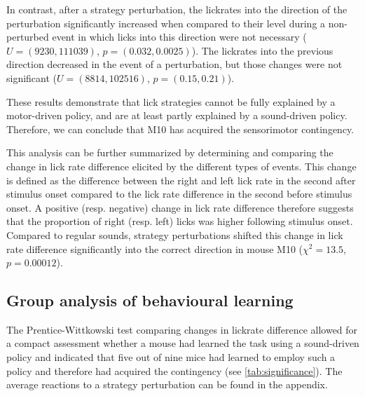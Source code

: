 \documentclass[]{report}
\theoremstyle{definition}
\theoremstyle{definition}
\theoremstyle{definition}
\theoremstyle{remark}
\begin{document}
In contrast, after a strategy perturbation, the lickrates into the
direction of the perturbation significantly increased when compared to
their level during a non-perturbed event in which licks into this
direction were not necessary (\(U=(9230,111039)\),
\(p=(0.032, 0.0025)\)). The lickrates into the previous direction
decreased in the event of a perturbation, but those changes were not
significant (\(U=(8814, 102516)\), \(p=(0.15, 0.21)\)).

These results demonstrate that lick strategies cannot be fully explained
by a motor-driven policy, and are at least partly explained by a
sound-driven policy. Therefore, we can conclude that M10 has acquired
the sensorimotor contingency.

This analysis can be further summarized by determining and comparing the
change in lick rate difference elicited by the different types of
events. This change is defined as the difference between the right and
left lick rate in the second after stimulus onset compared to the lick
rate difference in the second before stimulus onset. A positive (resp.
negative) change in lick rate difference therefore suggests that the
proportion of right (resp. left) licks was higher following stimulus
onset. Compared to regular sounds, strategy perturbations shifted this
change in lick rate difference significantly into the correct direction
in mouse M10 (\(\chi^2=13.5\), \(p=0.00012\)).

\hypertarget{group-analysis-of-behavioural-learning}{%
\subsection{Group analysis of behavioural
learning}\label{group-analysis-of-behavioural-learning}}

The Prentice-Wittkowski test comparing changes in lickrate difference
allowed for a compact assessment whether a mouse had learned the task
using a sound-driven policy and indicated that five out of nine mice had
learned to employ such a policy and therefore had acquired the
contingency (see \ref{tab:significance}). The average reactions to a
strategy perturbation can be found in the appendix.
\end{document}
